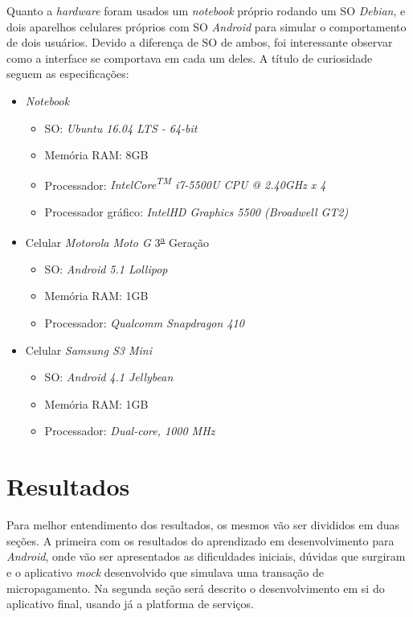 \documentclass[hidelinks,12pt]{article}
\begin{document}
Quanto a \textit{hardware} foram usados um \textit{notebook} pr\'oprio rodando um SO \textit{Debian}, e dois aparelhos celulares pr\'oprios com SO \textit{Android} para simular o comportamento de dois usu\'arios. Devido a diferen\c{c}a de SO de ambos, foi interessante observar como a interface se comportava em cada um deles. A t\'itulo de curiosidade seguem as especifica\c{c}\~oes:
\begin{itemize}
	\item \textit{Notebook}
	\begin{itemize}
		\item SO: \textit{Ubuntu 16.04 LTS - 64-bit}
		\item Mem\'oria RAM: 8GB
		\item Processador: \textit{Intel\textregistered Core\textsuperscript{TM} i7-5500U CPU @ 2.40GHz x 4}
		\item Processador gr\'afico: \textit{Intel\textregistered HD Graphics 5500 (Broadwell GT2)}
	\end{itemize}
	\item Celular \textit{Motorola Moto G} 3\textsuperscript{\underline{a}} Gera\c{c}\~ao
	\begin{itemize}
		\item SO: \textit{Android 5.1 Lollipop}
		\item Mem\'oria RAM: 1GB
		\item Processador: \textit{Qualcomm Snapdragon 410}
	\end{itemize}
	\item Celular \textit{Samsung S3 Mini}
	\begin{itemize}
		\item SO: \textit{Android 4.1 Jellybean}
		\item Mem\'oria RAM: 1GB
		\item Processador: \textit{Dual-core, 1000 MHz}
	\end{itemize}
\end{itemize}
\newpage
\section{Resultados}
Para melhor entendimento dos resultados, os mesmos v\~ao ser divididos em duas se\c{c}\~oes. A primeira com os resultados do aprendizado em desenvolvimento para \textit{Android}, onde v\~ao ser apresentados as dificuldades iniciais, dúvidas que surgiram e o aplicativo \textit{mock} desenvolvido que simulava uma transa\c{c}\~ao de micropagamento. Na segunda se\c{c}\~ao ser\'a descrito o desenvolvimento em si do aplicativo final, usando j\'a a platforma de servi\c{c}os.
\end{document}
